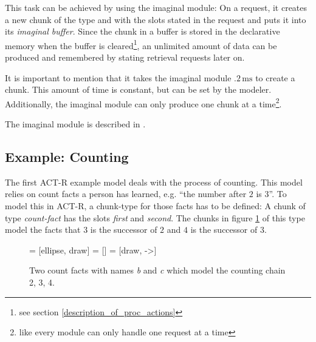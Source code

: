 This task can be achieved by using the imaginal module: On a request, it creates a new chunk of the type and with the slots stated in the request and puts it into its \emph{imaginal buffer}. Since the chunk in a buffer is stored in the declarative memory when the buffer is cleared\footnote{see section \ref{description_of_proc_actions}}, an unlimited amount of data can be produced and remembered by stating retrieval requests later on.

It is important to mention that it takes the imaginal module $.2\,\mathrm{ms}$ to create a chunk. This amount of time is constant, but can be set by the modeler. Additionally, the imaginal module can only produce one chunk at a time\footnote{like every module can only handle one request at a time}.

The imaginal module is described in \cite[unit 2]{actr_tutorial}.

\subsection{Example: Counting}
\label{example_counting}

The first ACT-R example model deals with the process of counting. This model relies on count facts a person has learned, e.g. ``the number after $2$ is $3$''. To model this in ACT-R, a chunk-type for those facts has to be defined: A chunk of type \emph{count-fact} has the slots \emph{first} and \emph{second}. The chunks in figure \ref{fig:example_counting_chunks} of this type model the facts that $3$ is the successor of $2$ and $4$ is the successor of $3$.

\begin{figure}[htb]
\centering
{} = [ellipse, draw]
 = [] 
 = [draw, ->]   

\caption{Two count facts with names \emph{b} and \emph{c} which model the counting chain 2, 3, 4.}
\label{fig:example_counting_chunks}
\end{figure}


